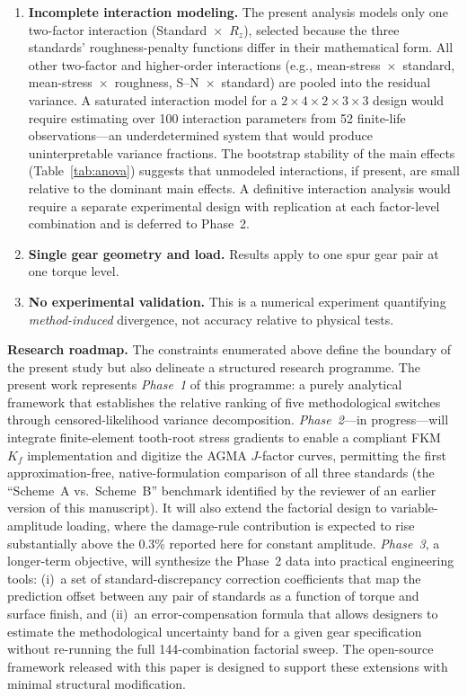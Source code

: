 \documentclass[12pt,a4paper]{article}
\begin{document}
\begin{enumerate}
  \item \textbf{Incomplete interaction modeling.} The present analysis
        models only one two-factor interaction (Standard~$\times$~$R_z$),
        selected because the three standards' roughness-penalty
        functions differ in their mathematical form. All other two-factor
        and higher-order interactions (e.g., mean-stress~$\times$~standard,
        mean-stress~$\times$~roughness, S--N~$\times$~standard) are pooled
        into the residual variance. A saturated interaction model for a
        $2\times4\times2\times3\times3$ design would require estimating
        over 100 interaction parameters from 52 finite-life
        observations---an underdetermined system that would produce
        uninterpretable variance fractions. The bootstrap stability of
        the main effects (Table~\ref{tab:anova}) suggests that unmodeled
        interactions, if present, are small relative to the dominant main
        effects. A definitive interaction analysis would require a
        separate experimental design with replication at each factor-level
        combination and is deferred to Phase~2.
  \item \textbf{Single gear geometry and load.} Results apply to one spur
        gear pair at one torque level.
  \item \textbf{No experimental validation.} This is a numerical
        experiment quantifying \emph{method-induced} divergence, not
        accuracy relative to physical tests.
\end{enumerate}

\medskip
\noindent\textbf{Research roadmap.}
The constraints enumerated above define the boundary of the present
study but also delineate a structured research programme. The present
work represents \emph{Phase~1} of this programme: a purely analytical
framework that establishes the relative ranking of five
methodological switches through censored-likelihood variance
decomposition. \emph{Phase~2}---in progress---will
integrate finite-element tooth-root stress gradients to enable a
compliant FKM $K_f$ implementation and digitize the AGMA $J$-factor
curves, permitting the first approximation-free, native-formulation
comparison of all three standards (the ``Scheme~A vs.\ Scheme~B''
benchmark identified by the reviewer of an earlier version of this
manuscript). It will also extend the factorial design to
variable-amplitude loading, where the damage-rule contribution is
expected to rise substantially above the 0.3\% reported here for
constant amplitude. \emph{Phase~3}, a longer-term objective, will
synthesize the Phase~2 data into practical engineering tools: (i)~a
set of standard-discrepancy correction coefficients that map the
prediction offset between any pair of standards as a function of
torque and surface finish, and (ii)~an error-compensation formula
that allows designers to estimate the methodological uncertainty
band for a given gear specification without re-running the full
144-combination factorial sweep. The open-source framework released
with this paper is designed to support these extensions with
minimal structural modification.
\end{document}
